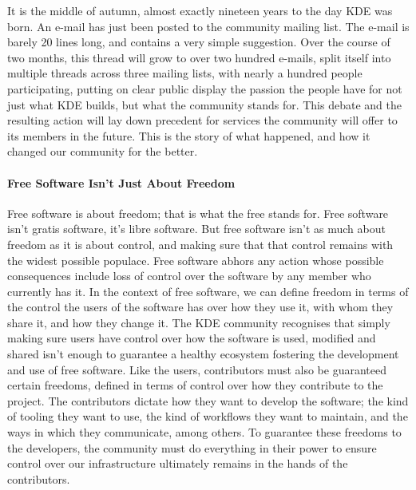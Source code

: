 

\noindent{}It is the middle of autumn, almost exactly nineteen years to the day KDE was born. An e-mail has just been posted to the community mailing list. The e-mail is barely 20 lines long, and contains a very simple suggestion. Over the course of two months, this thread will grow to over two hundred e-mails, split itself into multiple threads across three mailing lists, with nearly a hundred people participating, putting on clear public display the passion the people have for not just what KDE builds, but what the community stands for. This debate and the resulting action will lay down precedent for services the community will offer to its members in the future. This is the story of what happened, and how it changed our community for the better.

\paragraph{Free Software Isn’t Just About Freedom}
Free software is about freedom; that is what the free stands for. Free software isn’t gratis software, it’s libre software. But free software isn’t as much about freedom as it is about control, and making sure that that control remains with the widest possible populace. Free software abhors any action whose possible consequences include loss of control over the software by any member who currently has it. In the context of free software, we can define freedom in terms of the control the users of the software has over how they use it, with whom they share it, and how they change it.
The KDE community recognises that simply making sure users have control over how the software is used, modified and shared isn’t enough to guarantee a healthy ecosystem fostering the development and use of free software. Like the users, contributors must also be guaranteed certain freedoms, defined in terms of control over how they contribute to the project. The contributors dictate how they want to develop the software; the kind of tooling they want to use, the kind of workflows they want to maintain, and the ways in which they communicate, among others. To guarantee these freedoms to the developers, the community must do everything in their power to ensure control over our infrastructure ultimately remains in the hands of the contributors.

